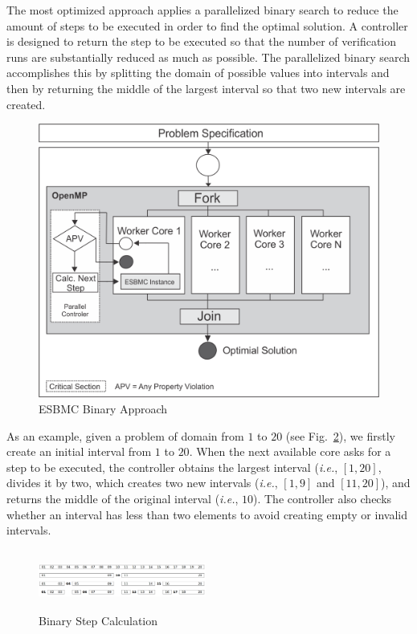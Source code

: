 The most optimized approach applies a parallelized binary search to reduce the amount of steps to be executed in order to find the optimal solution. A controller is designed to return the step to be executed so that the number of verification runs are substantially reduced as much as possible. The parallelized binary search accomplishes this by splitting the domain of possible values into intervals and then by returning the middle of the largest interval so that two new intervals are created.
%
\begin{figure}[ht]
	\centering
  \includegraphics[scale=0.75]{Image/esbmc-parallel-Controler.png} 
	\caption{ESBMC Binary Approach}
	\label{ESBMC-Binary-Approach}
\end{figure}

As an example, given a problem of domain from $1$ to $20$ (see Fig.~\ref{Binary-Step-Calculation}), we firstly create an initial interval from $1$ to $20$. When the next available core asks for a step to be executed, the controller obtains the largest interval ({\it i.e.}, $\left[1,20\right]$, divides it by two, which creates two new intervals ({\it i.e.}, $\left[1,9\right]$ and $\left[11,20\right]$), and returns the middle of the original interval ({\it i.e.}, $10$). The controller also checks whether an interval has less than two elements to avoid creating empty or invalid intervals.
%
\begin{figure}[ht]
	\centering
  \includegraphics[width=0.49\textwidth, height=75px]{Image/Fig4.png}
	\caption{Binary Step Calculation}
	\label{Binary-Step-Calculation}
\end{figure}

